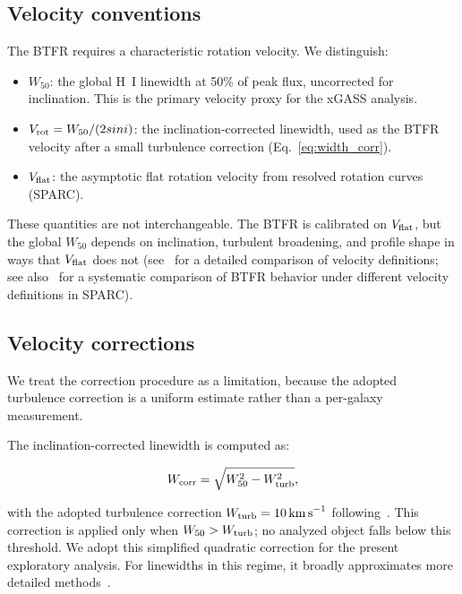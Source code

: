 \documentclass[11pt]{article}
\begin{document}
\subsection{Velocity conventions}

The BTFR requires a characteristic rotation velocity. We distinguish:

\begin{itemize}
\item $W_{50}$: the global H~I linewidth at 50\% of peak flux, uncorrected for inclination. This is the primary velocity proxy for the xGASS analysis.
\item $V_{\rm rot} = W_{50} / (2\\sin i)$: the inclination-corrected linewidth, used as the BTFR velocity after a small turbulence correction (Eq.~\ref{eq:width_corr}).
\item $V_{\rm flat}$: the asymptotic flat rotation velocity from resolved rotation curves (SPARC).
\end{itemize}

These quantities are not interchangeable. The BTFR is calibrated on $V_{\rm flat}$, but the global $W_{50}$ depends on inclination, turbulent broadening, and profile shape in ways that $V_{\rm flat}$ does not (see~\cite{ponomareva2018} for a detailed comparison of velocity definitions; see also~\cite{lelli2019} for a systematic comparison of BTFR behavior under different velocity definitions in SPARC).

\subsection{Velocity corrections}

We treat the correction procedure as a limitation, because the adopted turbulence correction is a uniform estimate rather than a per-galaxy measurement.

The inclination-corrected linewidth is computed as:

\begin{equation}
W_{\rm corr} = \sqrt{W_{50}^2 - W_{\rm turb}^2},\label{eq:width_corr}
\end{equation}

with the adopted turbulence correction $W_{\rm turb} = 10\,{\rm km\,s}^{-1}$ following~\cite{bradford2016}. This correction is applied only when $W_{50} > W_{\rm turb}$; no analyzed object falls below this threshold. We adopt this simplified quadratic correction for the present exploratory analysis. For linewidths in this regime, it broadly approximates more detailed methods~\cite{springob2005}.
\end{document}
